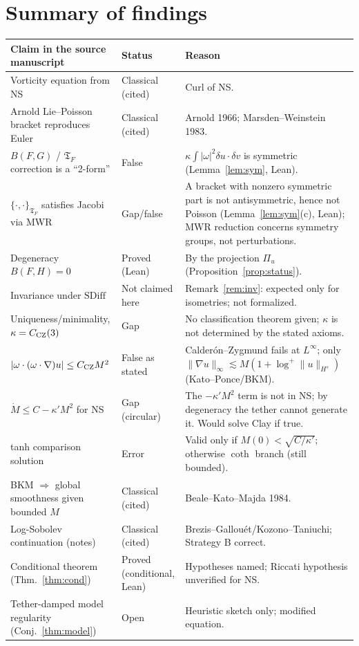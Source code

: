 \documentclass[11pt]{amsart}
\theoremstyle{definition}\newtheorem{definition}[theorem]{Definition}
\theoremstyle{remark}\newtheorem{remark}[theorem]{Remark}
\begin{document}
\section{Summary of findings}
\begin{center}\small
\begin{tabular}{p{4.6cm}p{2.1cm}p{4.6cm}}
\toprule
Claim in the source manuscript & Status & Reason\\\midrule
Vorticity equation from NS & Classical (cited) & Curl of NS.\\
Arnold Lie--Poisson bracket reproduces Euler & Classical (cited) & Arnold 1966; Marsden--Weinstein 1983.\\
$B(F,G)$ / $\mathfrak T_F$ correction is a ``2-form'' & False & $\kappa\int|\omega|^2\delta u\cdot\delta v$ is symmetric (Lemma~\ref{lem:sym}, Lean).\\
$\{\cdot,\cdot\}_{\mathfrak T_F}$ satisfies Jacobi via MWR & Gap/false & A bracket with nonzero symmetric part is not antisymmetric, hence not Poisson (Lemma~\ref{lem:sym}(c), Lean); MWR reduction concerns symmetry groups, not perturbations.\\
Degeneracy $B(F,H)=0$ & Proved (Lean) & By the projection $\Pi_u$ (Proposition~\ref{prop:status}).\\
Invariance under $\mathrm{SDiff}$ & Not claimed here & Remark~\ref{rem:inv}: expected only for isometries; not formalized.\\
Uniqueness/minimality, $\kappa=C_{\rm CZ}(3)$ & Gap & No classification theorem given; $\kappa$ is not determined by the stated axioms.\\
$|\omega\cdot(\omega\cdot\nabla)u|\le C_{\rm CZ}M^2$ & False as stated & Calder\'on--Zygmund fails at $L^\infty$; only $\|\nabla u\|_\infty\lesssim M(1+\log^+\|u\|_{H^s})$ (Kato--Ponce/BKM).\\
$\dot M\le C-\kappa'M^2$ for NS & Gap (circular) & The $-\kappa'M^2$ term is not in NS; by degeneracy the tether cannot generate it. Would solve Clay if true.\\
tanh comparison solution & Error & Valid only if $M(0)<\sqrt{C/\kappa'}$; otherwise $\coth$ branch (still bounded).\\
BKM $\Rightarrow$ global smoothness given bounded $M$ & Classical (cited) & Beale--Kato--Majda 1984.\\
Log-Sobolev continuation (notes) & Classical (cited) & Brezis--Gallou\'et/Kozono--Taniuchi; Strategy B correct.\\
Conditional theorem (Thm.~\ref{thm:cond}) & Proved (conditional, Lean) & Hypotheses named; Riccati hypothesis unverified for NS.\\
Tether-damped model regularity (Conj.~\ref{thm:model}) & Open & Heuristic sketch only; modified equation.\\
\bottomrule
\end{tabular}
\end{center}
\end{document}

